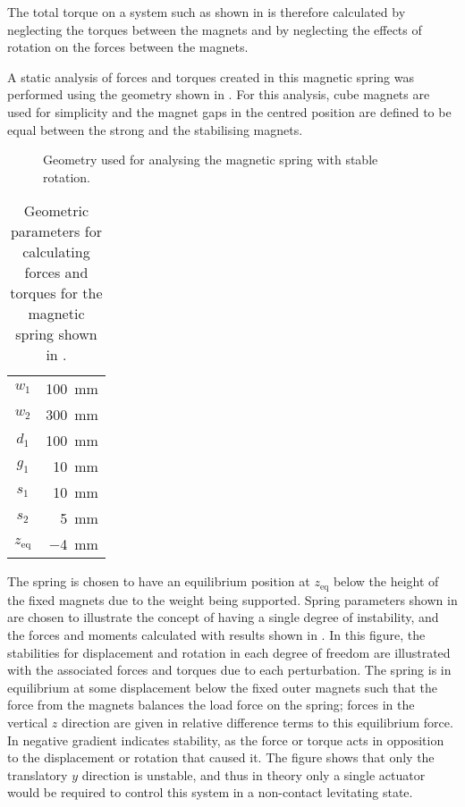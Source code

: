 \documentclass[11pt,a4paper]{memoir}
\begin{document}
The total torque on a system such as shown in  is therefore calculated by neglecting the torques between the magnets and by neglecting the effects of rotation on the forces between the magnets.

A static analysis of forces and torques created in this magnetic spring was performed using the geometry shown in . For this analysis, cube magnets are used for simplicity and the magnet gaps in the centred position are defined to be equal between the strong and the stabilising magnets.

\begin{figure}
  \caption{Geometry used for analysing the magnetic spring with stable rotation.}
\end{figure}

\begin{table}
  \caption{Geometric parameters for calculating forces and torques for the magnetic spring shown in .}
  \begin{tabular}{cr}
    \toprule
      $w_1$ &  \SI{100}{mm}  \\
      $w_2$ &  \SI{300}{mm}  \\
      $d_1$ &  \SI{100}{mm}  \\
      $g_1$ &  \SI {10}{mm}  \\
      $s_1$ &  \SI {10}{mm}  \\
      $s_2$ &  \SI  {5}{mm}  \\
    \midrule
      $z_{\text{eq}}$ & \SI{-4}{mm} \\
    \bottomrule
  \end{tabular}
\end{table}

The spring is chosen to have an equilibrium position at $z_{\text{eq}}$ below
the height of the fixed magnets due to the weight being supported.
Spring parameters shown in  are chosen to illustrate the concept of having a single degree of instability, and the forces and moments calculated with results shown in .
In this figure, the stabilities for displacement and rotation in each degree of freedom are illustrated with the associated forces and torques due to each perturbation.
The spring is in equilibrium at some displacement below the fixed outer magnets such that the force from the magnets balances the load force on the spring; forces in the vertical $z$ direction are given in relative difference terms to this equilibrium force.
In  negative gradient indicates stability, as the force or torque acts in opposition to the displacement or rotation that caused it.
The figure shows that only the translatory $y$ direction is unstable, and thus in theory only a single actuator would be required to control this system in a non-contact levitating state.
\end{document}
